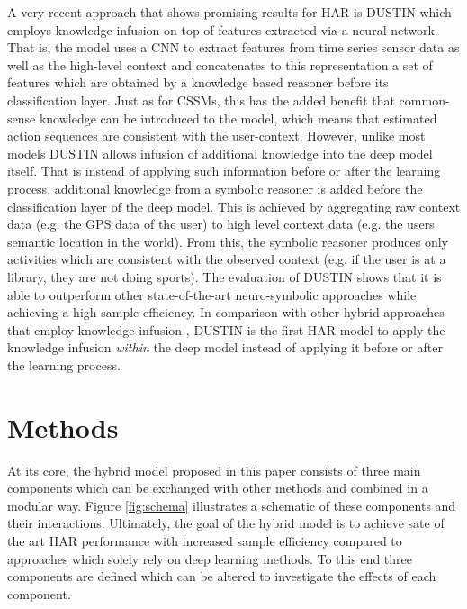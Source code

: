 \documentclass[11pt,titlepage,oneside,openany]{book}
\begin{document}
A very recent approach that shows promising results for HAR is DUSTIN \cite{arrotta_knowledge_2022} which employs knowledge infusion on top of features extracted via a neural network. That is, the model uses a CNN to extract features from time series sensor data as well as the high-level context and concatenates to this representation a set of features which are obtained by a knowledge based reasoner before its classification layer. Just as for CSSMs, this has the added benefit that common-sense knowledge can be introduced to the model, which means that estimated action sequences are consistent with the user-context. However, unlike most models DUSTIN allows infusion of additional knowledge into the deep model itself. That is instead of applying such information before or after the learning process, additional knowledge from a symbolic reasoner is added before the classification layer of the deep model. This is achieved by aggregating raw context data (e.g. the GPS data of the user) to high level context data (e.g. the users semantic location in the world). From this, the symbolic reasoner produces only activities which are consistent with the observed context (e.g. if the user is at a library, they are not doing sports). The evaluation of DUSTIN shows that it is able to outperform other state-of-the-art neuro-symbolic approaches while achieving a high sample efficiency. In comparison with other hybrid approaches that employ knowledge infusion \cite{bettini_caviar_2020, sukor_hybrid_2019}, DUSTIN is the first HAR model to apply the knowledge infusion \emph{within} the deep model instead of applying it before or after the learning process.


\chapter{Methods}
\label{cha:alg}

At its core, the hybrid model proposed in this paper consists of three main components which can be exchanged with other methods and combined in a modular way. Figure \ref{fig:schema} illustrates a schematic of these components and their interactions. Ultimately, the goal of the hybrid model is to achieve sate of the art HAR performance with increased sample efficiency compared to approaches which solely rely on deep learning methods. To this end three components are defined which can be altered to investigate the effects of each component.
\end{document}
